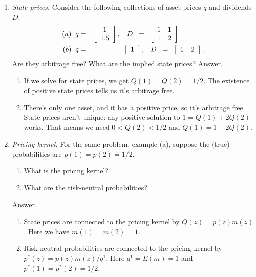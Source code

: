 \documentclass[11pt]{article}
\begin{document}
\begin{enumerate}
\item {\it State prices.\/}
Consider the following collections of asset prices $q$ and dividends $D$:
\begin{eqnarray*}
  (a) \;\;  q &=& \left[
            \begin{array}{c}
             1 \\ 1.5
            \end{array}
          \right], \;\;\;
        D \;\;=\;\;
            \left[
            \begin{array}{cc}
             1 & 1 \\ 1 & 2
            \end{array}
          \right]    \hspace*{0.5in}  \\
  (b) \;\;  q &=& \left[
            \begin{array}{c}
             1
            \end{array}
          \right], \;\;\;
        D \;\;=\;\;
            \left[
            \begin{array}{cc}
             1 & 2
            \end{array}
          \right]  .
\end{eqnarray*}
Are they arbitrage free?  What are the implied state prices?
%
Answer.
\begin{enumerate}
\item If we solve for state prices, we get $Q(1) = Q(2) = 1/2$.
The existence of positive state prices tells us it's arbitrage free.
\item There's only one asset, and it has a positive price,
so it's arbitrage free.
State prices aren't unique: any positive solution to $ 1 = Q(1) + 2 Q(2)$ works.
That means we need $ 0 < Q(2) < 1/2$ and $Q(1) = 1 - 2 Q(2)$.
\end{enumerate}

\item {\it Pricing kernel.\/} For the same problem, example (a), suppose
the (true) probabilities are $p(1) = p(2) = 1/2$.
\begin{enumerate}
\item What is the pricing kernel?
\item What are the risk-neutral probabilities?
\end{enumerate}
%
Answer.
\begin{enumerate}
\item State prices are connected to the pricing kernel by $Q(z) = p(z) m(z)$.
Here we have $m(1) = m(2) = 1$.
\item Risk-neutral probabilities are connected to the pricing kernel
by $p^*(z) = p(z) m(z) / q^1$.
Here $q^1 = E(m) = 1$ and $p^*(1) = p^*(2) = 1/2$.
\end{enumerate}


\end{enumerate}
\end{document}
